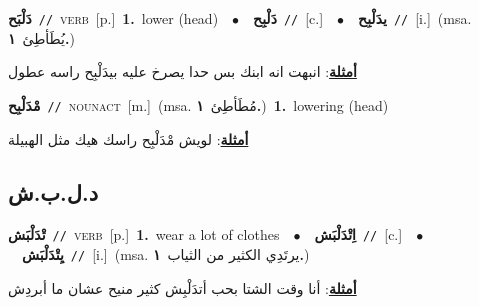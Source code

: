 \documentclass[10pt,a4paper,twoside]{article} %
\begin{document}
\begin{multicols}{2}
{\setlength\topsep{0pt}\textbf{\foreignlanguage{arabic}{دَلْبَح}}\ {\color{gray}\texttt{//}\color{black}}\ \textsc{verb}\ [p.]\ \textbf{1.}~lower (head)\ \ $\bullet$\ \ \setlength\topsep{0pt}\textbf{\foreignlanguage{arabic}{دَلْبِح}}\ {\color{gray}\texttt{//}\color{black}}\ [c.]\ \ $\bullet$\ \ \setlength\topsep{0pt}\textbf{\foreignlanguage{arabic}{يدَلْبِح}}\ {\color{gray}\texttt{//}\color{black}}\ [i.]\ \color{gray}(msa. \foreignlanguage{arabic}{يُطَأطِئ}~\foreignlanguage{arabic}{\textbf{١.}})\color{black}\  \begin{flushright}\color{gray}\foreignlanguage{arabic}{\textbf{\underline{\foreignlanguage{arabic}{أمثلة}}}: انبهت انه ابنك بس حدا يصرخ عليه بيدَلْبِح راسه عطول}\end{flushright}\color{black}} \vspace{2mm}

{\setlength\topsep{0pt}\textbf{\foreignlanguage{arabic}{مْدَلْبِح}}\ {\color{gray}\texttt{//}\color{black}}\ \textsc{noun\textunderscore act}\ [m.]\ \color{gray}(msa. \foreignlanguage{arabic}{مُطَأطِئ}~\foreignlanguage{arabic}{\textbf{١.}})\color{black}\ \textbf{1.}~lowering (head)\  \begin{flushright}\color{gray}\foreignlanguage{arabic}{\textbf{\underline{\foreignlanguage{arabic}{أمثلة}}}: لويش مْدَلْبِح راسك هيك مثل الهبيلة}\end{flushright}\color{black}} \vspace{2mm}

\vspace{-3mm}
\subsection*{\color{blue}\foreignlanguage{arabic}{د.ل.ب.ش}\color{blue}{}} 

{\setlength\topsep{0pt}\textbf{\foreignlanguage{arabic}{تْدَلْبَش}}\ {\color{gray}\texttt{//}\color{black}}\ \textsc{verb}\ [p.]\ \textbf{1.}~wear a lot of clothes\ \ $\bullet$\ \ \setlength\topsep{0pt}\textbf{\foreignlanguage{arabic}{اِتْدَلْبَش}}\ {\color{gray}\texttt{//}\color{black}}\ [c.]\ \ $\bullet$\ \ \setlength\topsep{0pt}\textbf{\foreignlanguage{arabic}{يِتْدَلْبَش}}\ {\color{gray}\texttt{//}\color{black}}\ [i.]\ \color{gray}(msa. \foreignlanguage{arabic}{يرتَدِي الكثير من الثياب}~\foreignlanguage{arabic}{\textbf{١.}})\color{black}\  \begin{flushright}\color{gray}\foreignlanguage{arabic}{\textbf{\underline{\foreignlanguage{arabic}{أمثلة}}}: أنا وقت الشتا بحب أتدَلْبِش كثير منيح عشان ما أبردِش}\end{flushright}\color{black}} \vspace{2mm}


\end{multicols}
\end{document}
